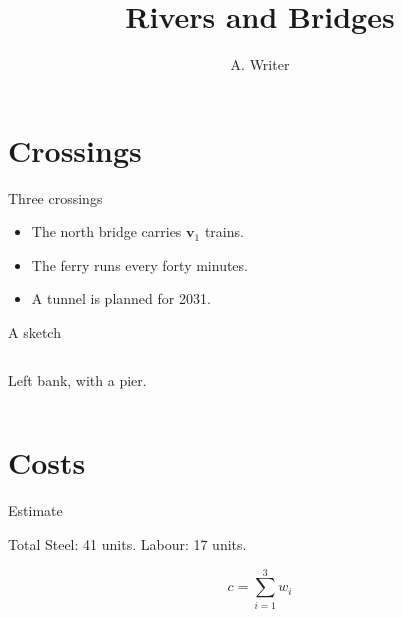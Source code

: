 \documentclass{beamer}
\title{Rivers and Bridges}
\author{A. Writer}
\newcommand{\vect}[1]{\mathbf{#1}}
\begin{document}
\begin{frame}
  \titlepage
\end{frame}
\section{Crossings}
\begin{frame}{Three crossings}
  \begin{itemize}
    \item<1-> The north bridge carries $\vect{v}_1$ trains.
    \item<2-> The ferry runs every \alert{forty} minutes.
    \item<3-> A tunnel is planned for 2031.
  \end{itemize}
\end{frame}
\begin{frame}{A sketch}
  \begin{columns}
    Left bank, with a pier.
  \end{columns}
\end{frame}
\section{Costs}
\begin{frame}{Estimate}
  \begin{block}{Total}
    Steel: 41 units. \pause Labour: 17 units.
  \end{block}
  \[ c = \sum_{i=1}^{3} w_i \]
\end{frame}
\end{document}

